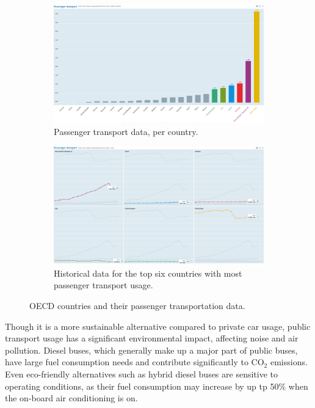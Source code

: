\documentclass{article}
\begin{document}
\begin{figure}[H]
  \centering
  \begin{subfigure}[b]{.8\textwidth}
  	\centering
  	\includegraphics[width=\linewidth]{./images/OECD_passengers_absolute.png}
  	\caption{Passenger transport data, per country.}
  \end{subfigure}
  \begin{subfigure}[b]{.8\textwidth}
  	\centering
  	\includegraphics[width=\linewidth]{./images/OECD_passengers_increase.png}
  	\caption{Historical data for the top six countries with most passenger transport usage.}
  \end{subfigure}
  \caption{OECD countries and their passenger transportation data.}
  	\label{fig:transportation/passenger}
\end{figure}

Though it is a more sustainable alternative compared to private car usage, public transport usage has a significant environmental impact, affecting noise and air pollution. Diesel buses, which generally make up a major part of public buses, have large fuel consumption needs and contribute significantly to CO$_{2}$ emissions. Even eco-friendly alternatives such as hybrid diesel buses are sensitive to operating conditions, as their fuel consumption may increase by up tp 50\% when the on-board air conditioning is on.\cite{zhang2014real}
\end{document}
